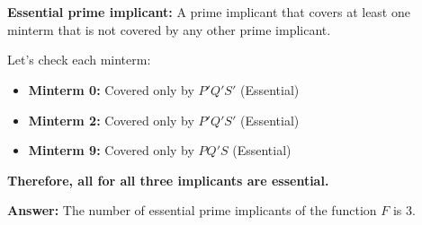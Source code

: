 \documentclass{article}
\begin{document}
\section*{\textfot{\textcolor{blue}{4. Identify the essential prime implicants:}}}

\textbf{Essential prime implicant:} A prime implicant that covers at least one minterm that is not covered by any other prime implicant.

Let's check each minterm:

\begin{itemize}
    \item \textbf{Minterm 0:} Covered only by $P'Q'S'$ (Essential)
    \item \textbf{Minterm 2:} Covered only by $P'Q'S'$ (Essential)
    \item \textbf{Minterm 9:} Covered only by $PQ'S$ (Essential)
\end{itemize}

\textbf{Therefore, all for all three implicants are essential.}

\textbf{Answer:} The number of essential prime implicants of the function $F$ is 3.
\end{document}
